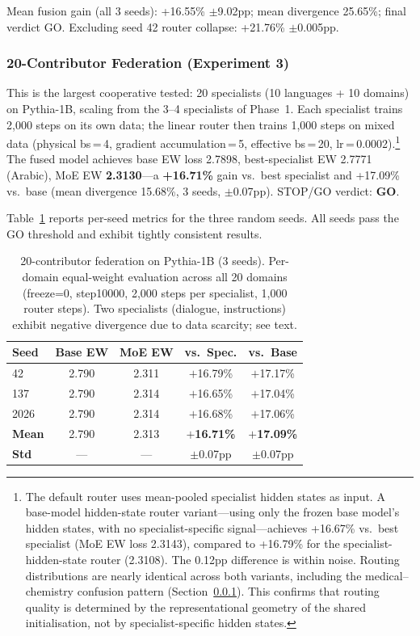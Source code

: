 \documentclass{article}
\begin{document}
Mean fusion gain (all 3 seeds): +16.55\% $\pm$9.02pp; mean divergence 25.65\%; final verdict GO. Excluding seed 42 router collapse: +21.76\% $\pm$0.005pp.

\subsubsection{20-Contributor Federation (Experiment 3)}
\label{sec:phase2_twenty}

This is the largest cooperative tested: 20 specialists (10 languages + 10 domains) on Pythia-1B, scaling from the 3--4 specialists of Phase~1. Each specialist trains 2,000 steps on its own data; the linear router then trains 1,000 steps on mixed data (physical bs\,=\,4, gradient accumulation\,=\,5, effective bs\,=\,20, lr\,=\,0.0002).\footnote{The default router uses mean-pooled specialist hidden states as input. A base-model hidden-state router variant---using only the frozen base model's hidden states, with no specialist-specific signal---achieves +16.67\% vs.\ best specialist (MoE EW loss 2.3143), compared to +16.79\% for the specialist-hidden-state router (2.3108). The 0.12pp difference is within noise. Routing distributions are nearly identical across both variants, including the medical--chemistry confusion pattern (Section~\ref{sec:phase2_twenty}). This confirms that routing quality is determined by the representational geometry of the shared initialisation, not by specialist-specific hidden states.} The fused model achieves base EW loss 2.7898, best-specialist EW 2.7771 (Arabic), MoE EW \textbf{2.3130}---a \textbf{+16.71\%} gain vs.\ best specialist and +17.09\% vs.\ base (mean divergence 15.68\%, 3 seeds, $\pm$0.07pp). STOP/GO verdict: \textbf{GO}.

Table~\ref{tab:twenty} reports per-seed metrics for the three random seeds. All seeds pass the GO threshold and exhibit tightly consistent results.

\begin{table}[h]
\centering
\caption{20-contributor federation on Pythia-1B (3 seeds). Per-domain equal-weight
evaluation across all 20 domains (freeze=0, step10000, 2{,}000 steps per specialist,
1{,}000 router steps). Two specialists (dialogue, instructions) exhibit negative
divergence due to data scarcity; see text.}
\label{tab:twenty}
\small
\begin{tabular}{lcccc}
\toprule
\textbf{Seed} & \textbf{Base EW} & \textbf{MoE EW} & \textbf{vs.\ Spec.} & \textbf{vs.\ Base} \\
\midrule
42   & 2.790 & 2.311 & $+$16.79\% & $+$17.17\% \\
137  & 2.790 & 2.314 & $+$16.65\% & $+$17.04\% \\
2026 & 2.790 & 2.314 & $+$16.68\% & $+$17.06\% \\
\midrule
\textbf{Mean} & 2.790 & 2.313 & \textbf{$+$16.71\%} & \textbf{$+$17.09\%} \\
\textbf{Std}  & ---   & ---   & $\pm$0.07pp        & $\pm$0.07pp        \\
\bottomrule
\end{tabular}
\end{table}
\end{document}
